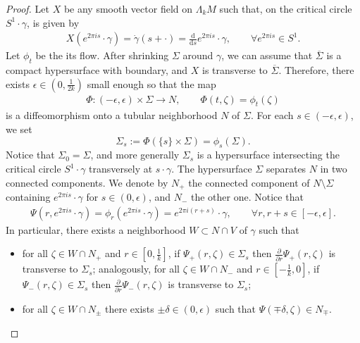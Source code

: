 \documentclass[reqno]{amsart}
\numberwithin{equation}{section}
\theoremstyle{personal}%
\theoremstyle{definition}
\newcommand{\diff}{\mathrm{d}}
\begin{document}
\begin{proof}
Let $X$ be any smooth vector field on $\Lambda_kM$ such that, on the critical circle $S^1\cdot\gamma$, is given by 
\begin{align*}
X(e^{2\pi i s}\cdot\gamma)=\dot\gamma(s+\cdot)=\tfrac{\diff}{\diff s} e^{2\pi is}\cdot\gamma,\qquad
\forall e^{2\pi i s}\in S^1.
\end{align*}
Let $\phi_t$ be the its flow. After shrinking $\Sigma$ around $\gamma$, we can assume that $\overline \Sigma$ is a compact hypersurface with boundary, and $X$ is transverse to $\overline\Sigma$.  Therefore, there exists $\epsilon\in(0,\tfrac1{2k})$ small enough so that the map
\begin{align*}
\Phi:(-\epsilon,\epsilon)\times\Sigma\to N,
\qquad
\Phi(t,\zeta)=\phi_t(\zeta)
\end{align*}
is a diffeomorphism onto a tubular neighborhood $N$ of $\Sigma$. For each $s\in(-\epsilon,\epsilon)$, we set 
\[\Sigma_s:=\Phi(\{s\}\times\Sigma)=\phi_s(\Sigma).\]
Notice that $\Sigma_0=\Sigma$, and more generally $\Sigma_s$ is a hypersurface intersecting the critical circle $S^1\cdot\gamma$ transversely at $s\cdot\gamma$. The hypersurface $\Sigma$ separates $N$ in two connected components. We denote by $N_+$ the connected component of $N\setminus\Sigma$ containing $e^{2\pi i s}\cdot\gamma$ for $s\in(0,\epsilon)$, and $N_-$ the other one. Notice that 
\begin{align*}
\Psi(r,e^{2\pi i s}\cdot\gamma)
=
\phi_r(e^{2\pi i s}\cdot\gamma)=e^{2\pi i (r+s)}\cdot\gamma,
\qquad
\forall r,r+s\in[-\epsilon,\epsilon].
\end{align*}
In particular, there exists a neighborhood $W\subset N\cap V$ of $\gamma$ such that
\begin{itemize}
\item for all $\zeta\in W\cap N_+$ and $r\in[0,\tfrac1k]$, if $\Psi_+(r,\zeta)\in\Sigma_s$ then $\tfrac{\partial}{\partial r} \Psi_+(r,\zeta)$ is transverse to $\Sigma_s$; analogously, for all $\zeta\in W\cap N_-$ and $r\in[-\tfrac1k,0]$, if $\Psi_-(r,\zeta)\in\Sigma_s$ then $\tfrac{\partial}{\partial r} \Psi_-(r,\zeta)$ is transverse to $\Sigma_s$;

\item for all $\zeta\in W\cap N_\pm$ there exists $\pm\delta\in(0,\epsilon)$ such that $\Psi(\mp\delta,\zeta)\in N_{\mp}$.
\end{itemize}


\end{proof}
\end{document}
